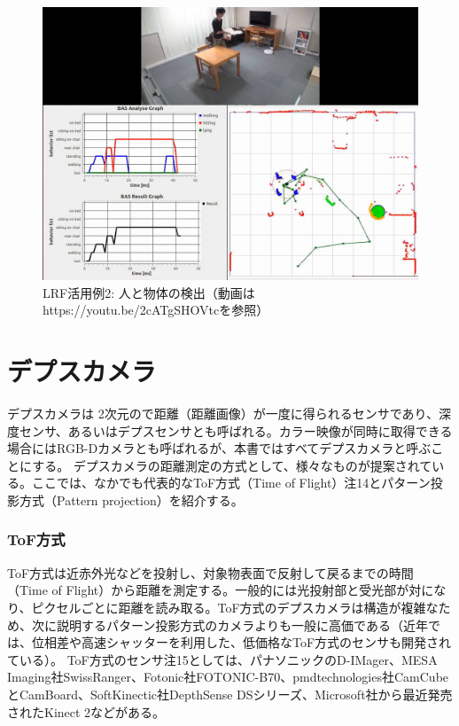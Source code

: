 \begin{figure}[ht]
  \centering
  \includegraphics[width=\columnwidth]{pictures/chapter8/pic_08_12.png}
  \caption{LRF活用例2: 人と物体の検出（動画はhttps://youtu.be/2cATgSHOVtcを参照）}
\end{figure}

\section{デプスカメラ}

デプスカメラは 2次元ので距離（距離画像）が一度に得られるセンサであり、深度センサ、あるいはデプスセンサとも呼ばれる。カラー映像が同時に取得できる場合にはRGB-Dカメラとも呼ばれるが、本書ではすべてデプスカメラと呼ぶことにする。
デプスカメラの距離測定の方式として、様々なものが提案されている。ここでは、なかでも代表的なToF方式（Time of Flight）注14とパターン投影方式（Pattern projection）を紹介する。

\subsubsection{ ToF方式}

ToF方式は近赤外光などを投射し、対象物表面で反射して戻るまでの時間（Time of Flight）から距離を測定する。一般的には光投射部と受光部が対になり、ピクセルごとに距離を読み取る。ToF方式のデプスカメラは構造が複雑なため、次に説明するパターン投影方式のカメラよりも一般に高価である（近年では、位相差や高速シャッターを利用した、低価格なToF方式のセンサも開発されている）。
ToF方式のセンサ注15としては、パナソニックのD-IMager、MESA Imaging社SwissRanger、Fotonic社FOTONIC-B70、pmdtechnologies社CamCubeとCamBoard、SoftKinectic社DepthSense DSシリーズ、Microsoft社から最近発売されたKinect 2などがある。


